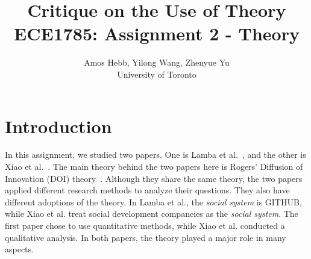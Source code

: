 \documentclass[journal,12pt,onecolumn,]{IEEEtran}
\begin{document}
\title{Critique on the Use of Theory\\
{\normalsize ECE1785: Assignment 2 - Theory}}

\author{Amos Hebb, Yilong Wang, Zhenyue Yu\\ \small University of Toronto}

\maketitle






\section{Introduction}

In this assignment, we studied two papers. One is Lamba et al.~\cite{lamba2020heard}, and the other is Xiao et al.~\cite{xiao2014social}. The main theory behind the two papers here is Rogers' Diffusion of Innovation (DOI) theory~\cite{rogers1995attributes}.
Although they share the same theory, the two papers applied different research methods to analyze their questions. They also have different adoptions of the theory. In Lamba et al., the \textit{social system} is GITHUB, while Xiao et al. treat social development companeies as the \textit{social system}.
The first paper chose to use quantitative methods, while Xiao et al. conducted a qualitative analysis. In both papers, the theory played a major role in many aspects.


\end{document}
